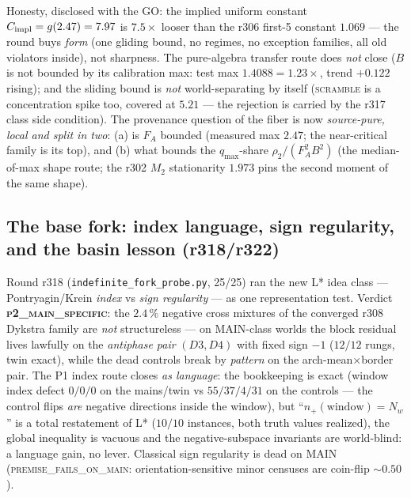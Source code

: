 \documentclass[11pt]{article}
\theoremstyle{definition}
\theoremstyle{remark}
\begin{document}
\noindent Honesty, disclosed with the GO: the implied uniform
constant $C_{\rm impl} = g(2.47) = 7.97$ is $7.5\times$ looser than
the r306 first-5 constant $1.069$ --- the round buys \emph{form}
(one gliding bound, no regimes, no exception families, all old
violators inside), not sharpness.  The pure-algebra transfer route
does \emph{not} close ($B$ is not bounded by its calibration max:
test max $1.4088 = 1.23\times$, trend $+0.122$ rising); and the
sliding bound is \emph{not} world-separating by itself
(\textsc{scramble} is a concentration spike too, covered at
$5.21$ --- the rejection is carried by the r317 class side
condition).  The provenance question of the fiber is now
\emph{source-pure, local and split in two}: (a) is $F_A$ bounded
(measured max $2.47$; the near-critical family is its top), and
(b) what bounds the $q_{\max}$-share $\rho_2/(F_A^2 B^2)$ (the
median-of-max shape route; the r302 $M_2$ stationarity $1.973$
pins the second moment of the same shape).

\subsection{The base fork: index language, sign regularity, and the
basin lesson (r318/r322)}\label{sec:basinlesson}

Round r318 (\texttt{indefinite\_fork\_probe.py}, 25/25) ran the new
L* idea class --- Pontryagin/Krein \emph{index} vs \emph{sign
regularity} --- as one representation test.  Verdict
\textbf{\textsc{p2\_main\_specific}}: the $2.4\,\%$ negative cross
mixtures of the converged r308 Dykstra family are \emph{not}
structureless --- on MAIN-class worlds the block residual lives
lawfully on the \emph{antiphase pair} $(D3, D4)$ with fixed sign
$-1$ ($12/12$ rungs, twin exact), while the dead controls break by
\emph{pattern} on the arch-mean$\times$border pair.  The P1 index
route closes \emph{as language}: the bookkeeping is exact (window
index defect $0/0/0$ on the mains/twin vs $55/37/4/31$ on the
controls --- the control flips \emph{are} negative directions inside
the window), but ``$n_+(\mathrm{window}) = N_w$'' is a total
restatement of L* ($10/10$ instances, both truth values realized),
the global inequality is vacuous and the negative-subspace
invariants are world-blind: a language gain, no lever.  Classical
sign regularity is dead on MAIN
(\textsc{premise\_fails\_on\_main}: orientation-sensitive minor
censuses are coin-flip $\sim 0.50$).
\end{document}

